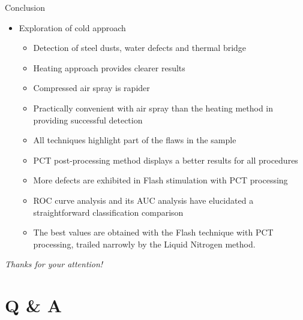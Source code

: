 \documentclass{beamer}
\begin{document}
\begin{frame}{Conclusion}
    \begin{itemize}%
        \item Exploration of cold approach
        \begin{itemize}
	        \item Detection of steel dusts, water defects and thermal bridge 
	        \item Heating approach provides clearer results
	        \item Compressed air spray is rapider  
	        \item Practically convenient with air spray than the heating method in providing successful detection
	        \pause
	        \item All techniques highlight part of the flaws in the sample
	        \item PCT post-processing method displays a better results for all procedures
	        \item More defects are exhibited in Flash stimulation with PCT processing
	        \item ROC curve analysis and its AUC analysis have elucidated a  straightforward classification comparison
	        \item The best values are obtained with the Flash technique with PCT processing, trailed narrowly by the Liquid Nitrogen method.	        
        \end{itemize}
    \end{itemize}
\end{frame}

\begin{frame}
	\centering
	\Huge{\textsf{\textit{Thanks for your attention!}}}
\end{frame}

\section*{Q \& A}

\end{document}
